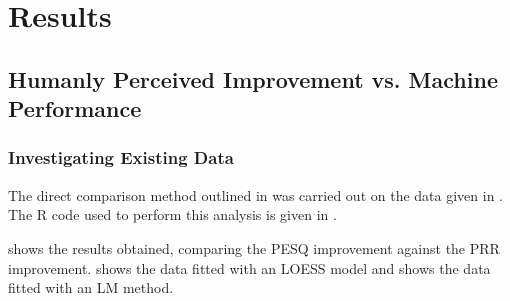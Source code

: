%

\chapter{Results}

\acresetall


\section{Humanly Perceived Improvement vs. Machine Performance}


\subsection{Investigating Existing Data}

The direct comparison method outlined in 
was carried out on the data given in  \textit{}.
The R code used to perform this analysis is given in .

 shows the results obtained, comparing the
\ac{PESQ} improvement against the \ac{PRR} improvement. 
shows the data fitted with an \ac{LOESS} model and 
shows the data fitted with an \ac{LM} method.

